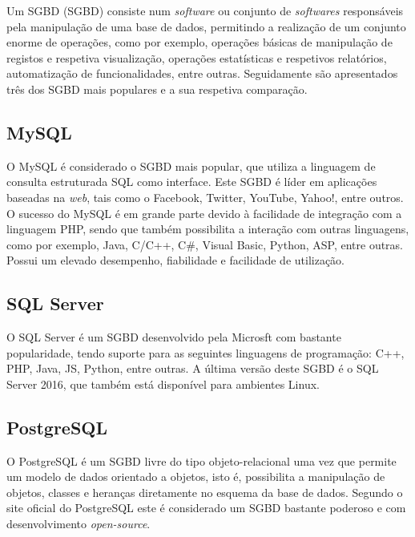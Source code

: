 Um \acl{SGBD} (\acs{SGBD}) consiste num \textit{software} ou conjunto de \textit{softwares} responsáveis pela manipulação de uma base de dados, permitindo a realização de um conjunto enorme de operações, como por exemplo, operações básicas de manipulação de registos e respetiva visualização, operações estatísticas e respetivos relatórios, automatização de funcionalidades, entre outras. Seguidamente são apresentados três dos \ac{SGBD} mais populares e a sua respetiva comparação. 


\subsection{MySQL}


O MySQL é considerado o \ac{SGBD} mais popular, que utiliza a linguagem de consulta estruturada \ac{SQL} como interface. Este \ac{SGBD} é líder em aplicações baseadas na \textit{web}, tais como o Facebook, Twitter, YouTube, Yahoo!, entre outros. O sucesso do MySQL é em grande parte devido à facilidade de  integração com a linguagem PHP, sendo que também possibilita a interação com outras linguagens, como por exemplo, Java, C/C++, C\#, Visual Basic, Python, ASP, entre outras. Possui um elevado desempenho, fiabilidade e facilidade de utilização\cite{MySQL2011}\cite{why-msql}.	








\subsection{SQL Server}

O SQL Server é um \ac{SGBD} desenvolvido pela Microsft com bastante popularidade, tendo suporte para as seguintes linguagens de programação: C++, PHP, Java, \ac{JS}, Python, entre outras. A última versão deste \ac{SGBD} é o SQL Server 2016, que também está disponível para ambientes Linux\cite{linuxsqlserver}.




\subsection{PostgreSQL}

O PostgreSQL é um \ac{SGBD} livre do tipo objeto-relacional uma vez que permite um modelo de dados orientado a objetos, isto é, possibilita a manipulação de objetos, classes e heranças diretamente no esquema da base de dados. Segundo o site oficial do PostgreSQL este é considerado um \ac{SGBD} bastante poderoso e com desenvolvimento \textit{open-source}\cite{ThePostgreSQLGlobalDevelopmentGroup2012}. 


